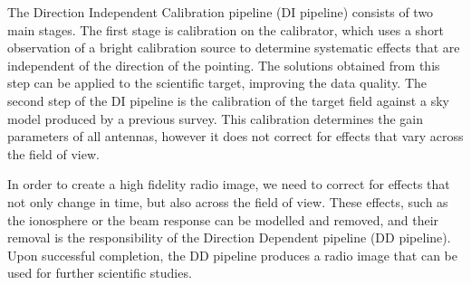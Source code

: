 The Direction Independent Calibration pipeline (DI pipeline) consists of two main stages. The first stage is calibration on the calibrator, which uses a short observation of a bright calibration source to determine systematic effects that are independent of the direction of the pointing. The solutions obtained from this step can be applied to the scientific target, improving the data quality. The second step of the DI pipeline is the calibration of the target field against a sky model produced by a previous survey. This calibration determines the gain parameters of all antennas, however it does not correct for effects that vary across the field of view. 
 
In order to create a high fidelity radio image, we need to correct for effects that not only change in time, but also across the field of view. These effects, such as the ionosphere or the beam response can be modelled and removed, and their removal is the responsibility of the Direction Dependent pipeline (DD pipeline). Upon successful completion, the DD pipeline produces a radio image that can be used for further scientific studies.

